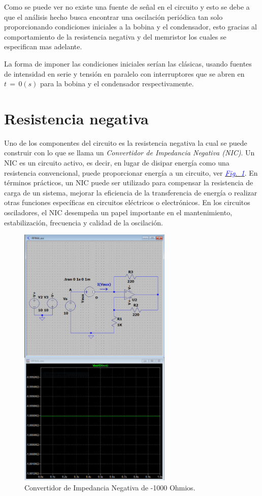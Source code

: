 \documentclass[12pt,a4paper]{report} %
\newcommand{\fref}[1]{\hyperref[#1]{\textcolor{blue}{\textit{Fig.~\ref*{#1}}}}}
\begin{document}
	Como se puede ver no existe una fuente de señal en el circuito y esto se debe a que el análisis hecho busca encontrar una oscilación periódica tan solo proporcionando condiciones iniciales a la bobina y el condensador, esto gracias al comportamiento de la resistencia negativa y del memristor los cuales se especifican mas adelante.
	
	\vspace{0.5cm}La forma de imponer las condiciones iniciales serían las clásicas, usando fuentes de intensidad en serie y tensión en paralelo con interruptores que se abren en \\$t\,=\,0(s)$ para la bobina y el condensador respectivamente.
	
	\newpage
	\section{Resistencia negativa}
	\noindent Uno de los componentes del circuito es la resistencia negativa la cual se puede construir con lo que se llama un \emph{Convertidor de Impedancia Negativa (NIC)}. Un NIC es un circuito activo, es decir, en lugar de disipar energía como una resistencia convencional, puede proporcionar energía a un circuito, ver \fref{fig:NIC}. En términos prácticos, un NIC puede ser utilizado para compensar la resistencia de carga de un sistema, mejorar la eficiencia de la transferencia de energía o realizar otras funciones específicas en circuitos eléctricos o electrónicos. En los circuitos osciladores, el NIC desempeña un papel importante en el mantenimiento, estabilización, frecuencia y calidad de la oscilación.
	 
	\begin{figure}[h]
		\centering
		\includegraphics[width=0.65\textwidth]{NIC_B.jpg}
		\caption{Convertidor de Impedancia Negativa de -1000 Ohmios.}
		\label{fig:NIC}
	\end{figure}
	
\end{document}
